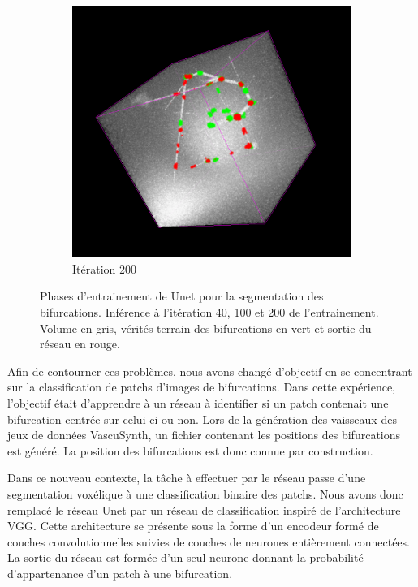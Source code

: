 \begin{figure}[!ht]
\begin{subfigure}{0.45\textwidth}
        \includegraphics[width=\textwidth]{Images/exp_seg_200.png}
        \caption{Itération 200}
    \end{subfigure}
    \caption{Phases d'entrainement de Unet pour la segmentation des bifurcations. Inférence à l'itération 40, 100 et 200 de l'entrainement. Volume en gris, vérités terrain des bifurcations en vert et sortie du réseau en rouge. }
    \label{fig:seg_deep}
\end{figure}

Afin de contourner ces problèmes, nous avons changé d'objectif en se concentrant sur la classification de patchs d'images de bifurcations. Dans cette expérience, l'objectif était d'apprendre à un réseau à identifier si un patch contenait une bifurcation centrée sur celui-ci ou non. Lors de la génération des vaisseaux des jeux de données VascuSynth, un fichier contenant les positions des bifurcations est généré. La position des bifurcations est donc connue par construction.

Dans ce nouveau contexte, la tâche à effectuer par le réseau passe d'une segmentation voxélique à une classification binaire des patchs. Nous avons donc remplacé le réseau Unet par un réseau de classification inspiré de l'architecture VGG. Cette architecture se présente sous la forme d'un encodeur formé de couches convolutionnelles suivies de couches de neurones entièrement connectées. La sortie du réseau est formée d'un seul neurone donnant la probabilité d'appartenance d'un patch à une bifurcation. 

